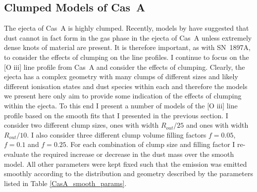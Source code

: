 \subsection{Clumped Models of Cas~A}

The ejecta of Cas~A is highly clumped.  Recently, models by \citet{Biscaro2014} have suggested that dust cannot in fact form in the gas phase in the ejecta of Cas~A unless extremely dense knots of material are present.  It is therefore important, as with SN~1897A, to consider the effects of clumping on the line profiles.  I continue to focus on the [O {\sc iii}] line profile from Cas~A and consider the effects of clumping.  Clearly, the ejecta has a complex geometry with many clumps of different sizes and likely different ionisation states and dust species within each and therefore the models we present here only aim to provide some indication of the effects of clumping within the ejecta.  To this end I present a number of models of the [O {\sc iii}] line profile based on the smooth fits that I presented in the previous section.  I consider two different clump sizes, ones with width $R_{out}/25$ and ones with width $R_{out}/10$.  I also consider three different clump volume filling factors $f=0.05$, $f=0.1$ and $f=0.25$.  For each combination of clump size and filling factor I re-evaluate the required increase or decrease in the dust mass over the smooth model.  All other parameters were kept fixed such that the emission was emitted smoothly according to the distribution and geometry described by the parameters listed in Table \ref{CasA_smooth_params}.


